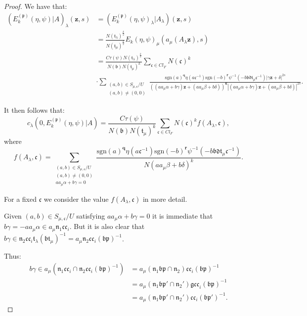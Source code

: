 \documentclass[a4paper,oneside]{amsart}
\theoremstyle{plain}
\theoremstyle{definition}
\begin{document}
\begin{proof}
We have that: \begin{align*}(E_k^{(\mathfrak{p})}(\eta,\psi)|A)_{\lambda}(\textbf{z},s)  &= (E^{(\mathfrak{p})}_k(\eta,\psi)_{\lambda}|A_{\lambda})(\textbf{z},s) \\&= \frac{N(\mathfrak{t}_{\lambda})^{\frac{k}{2}}}{N(\mathfrak{t}_{\mu})^{\frac{k}{2}}}E_k(\eta,\psi)_{\mu}(a_{\mu}(A_{\lambda}\textbf{z}),s) \\ &= \frac{C\tau(\psi)N(\mathfrak{t}_{\lambda})^{\frac{k}{2}}}{N(\mathfrak{b})N(\mathfrak{t}_{\mu})^{k}}\sum_{\mathfrak{c}\in Cl_F}N(\mathfrak{c})^k\\ &\cdot\sum_{\substack{(a,b)\in S_{\mu,\mathfrak{c}}/U \\ (a,b) \ne (0,0)}}\frac{\text{sgn}(a)^{\textbf{q}}\eta(a\mathfrak{c}^{-1})\text{sgn}(-b)^{\textbf{r}}\psi^{-1}(-b\mathfrak{bdt}_{\mu}\mathfrak{c}^{-1})|\gamma\textbf{z}+\delta|^{2s}}{((aa_{\mu}\alpha+b\gamma)\textbf{z}+(aa_{\mu}\beta+b\delta))^{\textbf{k}} |(aa_{\mu}\alpha+b\gamma)\textbf{z}+(aa_{\mu}\beta+b\delta)|^{2s}}.\end{align*}

It then follows that: \[c_{\lambda}(0,E_k^{(\mathfrak{p})}(\eta,\psi)|A) = \frac{C\tau(\psi)}{N(\mathfrak{b})N(\mathfrak{t}_{\mu})^{k}}\sum_{\mathfrak{c}\in Cl_F}N(\mathfrak{c})^kf(A_{\lambda},\mathfrak{c}),\] where \[f(A_{\lambda},\mathfrak{c}) = \sum_{\substack{(a,b)\in S_{\mu,\mathfrak{c}}/U \\ (a,b) \ne (0,0)\\ aa_{\mu}\alpha+b\gamma = 0}}\frac{\text{sgn}(a)^{\textbf{q}}\eta(a\mathfrak{c}^{-1})\text{sgn}(-b)^{\textbf{r}}\psi^{-1}(-b\mathfrak{bdt}_{\mu}\mathfrak{c}^{-1})}{N(aa_{\mu}\beta+b\delta)^k}.\]

For a fixed $\mathfrak{c}$ we consider the value $f(A_{\lambda},\mathfrak{c})$ in more detail.

Given $(a,b)\in S_{\mu,\mathfrak{c}}/U$ satisfying $aa_{\mu}\alpha+b\gamma = 0$ it is immediate that $b\gamma = -aa_{\mu}\alpha\in a_{\mu}\mathfrak{n}_1\mathfrak{cc}_i$. But it is also clear that $b\gamma \in \mathfrak{n}_2\mathfrak{cc}_i\mathfrak{t}_{\lambda}(\mathfrak{bt}_{\mu})^{-1} = a_{\mu}\mathfrak{n}_2\mathfrak{cc}_{i}(\mathfrak{bp})^{-1}$. 

Thus: \begin{align*}b\gamma \in a_{\mu}(\mathfrak{n}_1\mathfrak{cc}_i \cap \mathfrak{n}_2\mathfrak{cc}_i(\mathfrak{bp})^{-1}) &= a_{\mu}(\mathfrak{n}_1\mathfrak{bp}\cap \mathfrak{n}_2)\mathfrak{cc}_i(\mathfrak{bp})^{-1}\\ &=a_{\mu}(\mathfrak{n}_1\mathfrak{bp'}\cap\mathfrak{n}_2')\mathfrak{gcc}_i(\mathfrak{bp})^{-1}\\ &= a_{\mu}(\mathfrak{n}_1\mathfrak{bp'}\cap\mathfrak{n}_2')\mathfrak{cc}_i(\mathfrak{bp'})^{-1}.\end{align*}


\end{proof}
\end{document}
